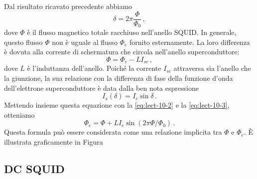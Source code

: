 Dal risultato ricavato precedente abbiamo
\begin{equation}
    \delta = 2\pi \frac{\Phi}{\Phi_0} \, ,
    \label{eq:lect-10-2}
\end{equation}
dove $\Phi$ è il flusso magnetico totale racchiuso nell'anello SQUID. In generale, questo flusso $\Phi$ non è uguale al flusso $\Phi_e$ fornito esternamente. La loro differenza è dovuta alla corrente di schermatura che circola nell'anello superconduttore:
\begin{equation}
    \Phi = \Phi_e - LI_{sc} \, ,
    \label{eq:lect-10-3}
\end{equation}
dove $L$ è l'induttanza dell'anello. Poiché la corrente $I_{sc}$ attraversa sia l'anello che la giunzione, la sua relazione con la differenza di fase della funzione d'onda dell'elettrone superconduttore è data dalla ben nota espressione
\begin{equation*}
    I_s(\delta)=I_c\sin \delta \, .
\end{equation*}
Mettendo insieme questa equazione con la \eqref{eq:lect-10-2} e la \eqref{eq:lect-10-3}, otteniamo
\begin{equation*}
    \Phi_e = \Phi + LI_c\sin\left(2\pi\Phi/\Phi_0\right) \, .
\end{equation*}
Questa formula può essere considerata come una relazione implicita tra $\Phi$ e $\Phi_e$. È illustrata graficamente in Figura

\subsection{DC SQUID}

